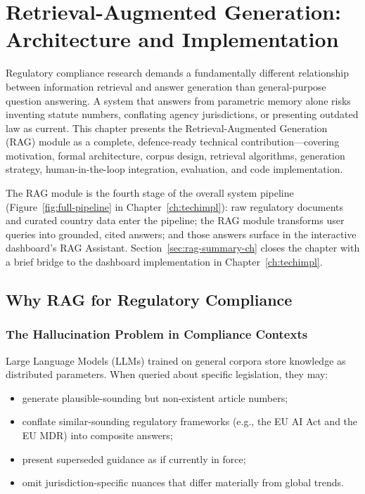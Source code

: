 \chapter{Retrieval-Augmented Generation: Architecture and Implementation}
\label{ch:rag}
\label{sec:rag}

Regulatory compliance research demands a fundamentally different relationship between
information retrieval and answer generation than general-purpose question answering.
A system that answers from parametric memory alone risks inventing statute numbers,
conflating agency jurisdictions, or presenting outdated law as current. This chapter
presents the Retrieval-Augmented Generation (RAG) module as a complete, defence-ready
technical contribution---covering motivation, formal architecture, corpus design,
retrieval algorithms, generation strategy, human-in-the-loop integration, evaluation,
and code implementation.

The RAG module is the fourth stage of the overall system pipeline
(Figure~\ref{fig:full-pipeline} in Chapter~\ref{ch:techimpl}): raw regulatory
documents and curated country data enter the pipeline; the RAG module transforms
user queries into grounded, cited answers; and those answers surface in the
interactive dashboard's RAG Assistant. Section~\ref{sec:rag-summary-ch} closes the
chapter with a brief bridge to the dashboard implementation in Chapter~\ref{ch:techimpl}.

\section{Why RAG for Regulatory Compliance}
\label{sec:rag-why-full}

\subsection{The Hallucination Problem in Compliance Contexts}
\label{sec:rag-hallucination}

Large Language Models (LLMs) trained on general corpora store knowledge as
distributed parameters. When queried about specific legislation, they may:
\begin{itemize}[noitemsep]
  \item generate plausible-sounding but non-existent article numbers;
  \item conflate similar-sounding regulatory frameworks (e.g., the EU AI Act and
        the EU MDR) into composite answers;
  \item present superseded guidance as if currently in force;
  \item omit jurisdiction-specific nuances that differ materially from global trends.
\end{itemize}

